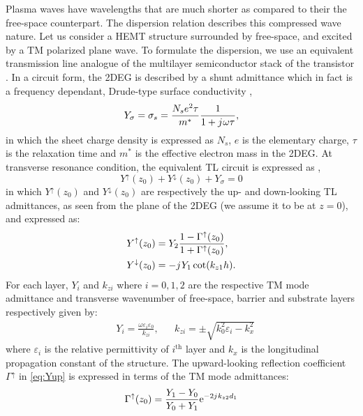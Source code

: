 \documentclass{ieeeaccess}
\renewcommand{\O}{\omega}  %
\newcommand{\E}{\varepsilon}  %
\renewcommand{\^}{\hat}  %
\newcommand{\e}{\mathrm{e}} %
\renewcommand{\j}{{j}\mkern1mu} %
\begin{document}
Plasma waves have wavelengths that are much shorter as compared to their the free-space counterpart. The dispersion relation describes this compressed wave nature. Let us consider a HEMT structure surrounded by free-space, and excited by a $\mathrm{TM}$ polarized plane wave. To formulate the dispersion, we use an equivalent transmission line analogue of the multilayer semiconductor stack of the transistor \cite{Kastner1988,Michalski2005}. In a circuit form, the 2DEG is described by a shunt admittance which in fact is a frequency dependant, Drude-type surface conductivity \cite{Burke2000},
%
\begin{equation}
  Y_{\sigma} = \sigma_s = \frac{N_s e^2 \tau}{m^{\ast}}\frac{1}{1 + \j \O \tau},
  \label{eq:Y2deg}
\end{equation}
%
in which the sheet charge density is expressed as $N_s$, $e$ is the elementary charge, $\tau$ is the relaxation time and $m^{\ast}$ is the effective electron mass in the 2DEG. At transverse resonance condition, the equivalent TL circuit is expressed as \cite{Gomez-Diaz2012},
%
\begin{equation}
  Y^{\uparrow}(z_0) + Y^{\downarrow}(z_0) + Y_{\sigma} = 0
  \label{eq:dispersion}
\end{equation}
%
in which $Y^{\uparrow}(z_0)$ and $Y^{\downarrow}(z_0)$ are respectively the up- and down-looking TL admittances, as seen from the plane of the 2DEG (we assume it to be at $z = 0$), and expressed as:
%
\begin{subequations}
  \begin{align}
    Y^{\uparrow}(z_0) &=  Y_2 \frac{1 - \Gamma^{\uparrow}(z_0)}{1 + \Gamma^{\uparrow}(z_0)},
    \label{eq:Yup} \\
    Y^{\downarrow}(z_0) &=  -\j Y_1 \cot (k_{z1} h).
    \label{eq:Ydown}
  \end{align}
  \label{eq:Y}%
\end{subequations}
%
For each layer, $Y_{i}$ and $k_{zi}$ where $i = 0,1,2$ are the respective TM mode admittance and transverse wavenumber of free-space, barrier and substrate layers respectively given by:
%
\begin{align}
  & Y_i = \frac{\O \E_i \E_0}{k_{zi}}, && k_{zi} = \pm \sqrt{k_0^2 \E_i - k_x^2}
  \label{eq:Yandk}
\end{align}
%
where $\E_i$ is the relative permittivity of $i^{\text{th}}$ layer and $k_x$ is the longitudinal propagation constant of the structure. The upward-looking reflection coefficient $\Gamma^{\uparrow}$ in \eqref{eq:Yup} is expressed in terms of the TM mode admittances:
%
\begin{equation}
  \Gamma^{\uparrow}(z_0) = \frac{Y_1 - Y_0}{Y_0 + Y_1} \e^{-2\j k_{z2}d_1}
  \label{eq:Gamma}
\end{equation}
%
\end{document}
